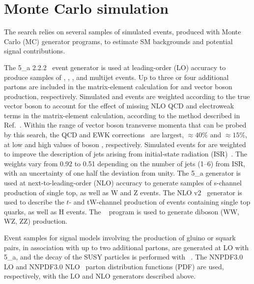 
\section{Monte Carlo simulation}
\label{sec:simulation}

The search relies on several samples of simulated events, produced
with Monte Carlo (MC) generator programs, to estimate SM backgrounds
and potential signal contributions.

The {\MADGRAPH{}5\_a\MCATNLO} 2.2.2~\cite{Alwall2014} event generator
is used at leading-order (LO) accuracy to produce samples of \wj, \zj,
\ttbar, and multijet events. Up to three or four additional partons
are included in the matrix-element calculation for \ttbar and
vector boson production, respectively. Simulated \wj and \zj events are
weighted according to the true vector boson \pt %
to account for the effect of missing NLO QCD and electroweak terms in
the matrix-element calculation, according to the method described in
Ref.~\cite{Khachatryan:2016mdm}. Within the range of vector boson
transverse momenta that can be probed by this search, the QCD and EWK
corrections~\cite{Kuhn:2005gv} are largest, ${\approx}40\%$ and
${\approx}15\%$, at low and high values of boson \pt,
respectively. Simulated events for \ttbar are weighted to improve the
description of jets arising from initial-state radiation
(ISR)~\cite{Chatrchyan:2013xna}. The weights vary from 0.92 to 0.51
depending on the number of jets (1--6) from ISR, with an uncertainty
of one half the deviation from unity. The {\MADGRAPH{}5\_a\MCATNLO}
generator is used at next-to-leading-order (NLO) accuracy to generate
samples of s-channel production of single top, as well as {\ttbar}W
and {\ttbar}Z events. The NLO \POWHEG v2~\cite{powheg, powheg_top_Wt}
generator is used to describe the $t$- and tW-channel production of
events containing single top quarks, as well as {\ttbar}H events. The
~\cite{pythia} program is used to generate diboson (WW,
WZ, ZZ) production.

Event samples for signal models involving the production of gluino or
squark pairs, in association with up to two additional partons, are
generated at LO with {\MADGRAPH{}5\_a\MCATNLO}, and the decay of the
SUSY particles is performed with ~\cite{pythia}. The
\textsc{NNPDF}3.0 LO and \textsc{NNPDF}3.0 NLO~\cite{nnpdf} parton
distribution functions (PDF) are used, respectively, with the LO and
NLO generators described above.

